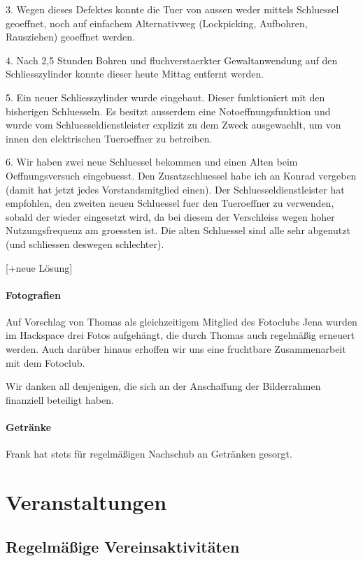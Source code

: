 \documentclass[10pt,DIV16]{scrartcl}
\begin{document}
3. Wegen dieses Defektes konnte die Tuer von aussen weder mittels
Schluessel geoeffnet, noch auf einfachem Alternativweg (Lockpicking,
Aufbohren, Rausziehen) geoeffnet werden.

4. Nach 2,5 Stunden Bohren und fluchverstaerkter Gewaltanwendung auf den
Schliesszylinder konnte dieser heute Mittag entfernt werden.

5. Ein neuer Schliesszylinder wurde eingebaut. Dieser funktioniert mit
den bisherigen Schluesseln. Es besitzt ausserdem eine
Notoeffnungsfunktion und wurde vom Schluesseldienstleister explizit zu
dem Zweck ausgewaehlt, um von innen den elektrischen Tueroeffner zu
betreiben.

6. Wir haben zwei neue Schluessel bekommen und einen Alten beim
Oeffnungsversuch eingebuesst. Den Zusatzschluessel habe ich an Konrad
vergeben (damit hat jetzt jedes Vorstandsmitglied einen). Der
Schluesseldienstleister hat empfohlen, den zweiten neuen Schluessel fuer
den Tueroeffner zu verwenden, sobald der wieder eingesetzt wird, da bei
diesem der Verschleiss wegen hoher Nutzungsfrequenz am groessten ist.
Die alten Schluessel sind alle sehr abgenutzt (und schliessen deswegen
schlechter).

[+neue Lösung]

\paragraph{Fotografien}

Auf Vorschlag von Thomas als gleichzeitigem Mitglied des Fotoclubs Jena wurden
im Hackspace drei Fotos aufgehängt, die durch Thomas auch regelmäßig erneuert
werden.  Auch darüber hinaus erhoffen wir uns eine fruchtbare Zusammenarbeit
mit dem Fotoclub.

Wir danken all denjenigen, die sich an der Anschaffung der Bilderrahmen
finanziell beteiligt haben.

\paragraph{Getränke}

Frank hat stets für regelmäßigen Nachschub an Getränken gesorgt.

\section{Veranstaltungen}

\subsection{Regelmäßige Vereinsaktivitäten}
\end{document}
